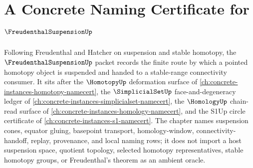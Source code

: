 \chapter{A Concrete Naming Certificate for $\FreudenthalSuspensionUp$}
\label{ch:concrete-instances-freudenthal-suspension-namecert}

Following Freudenthal and Hatcher on suspension and stable homotopy, the $\FreudenthalSuspensionUp$ packet records the finite route by which a pointed homotopy object is suspended and handed to a stable-range connectivity consumer. It sits after the $\HomotopyUp$ deformation surface of \autoref{ch:concrete-instances-homotopy-namecert}, the $\SimplicialSetUp$ face-and-degeneracy ledger of \autoref{ch:concrete-instances-simplicialset-namecert}, the $\HomologyUp$ chain-read surface of \autoref{ch:concrete-instances-homology-namecert}, and the S1Up circle certificate of \autoref{ch:concrete-instances-s1-namecert}. The chapter names suspension cones, equator gluing, basepoint transport, homology-window, connectivity-handoff, replay, provenance, and local naming rows; it does not import a host suspension space, quotient topology, selected homotopy representatives, stable homotopy groups, or Freudenthal's theorem as an ambient oracle.


